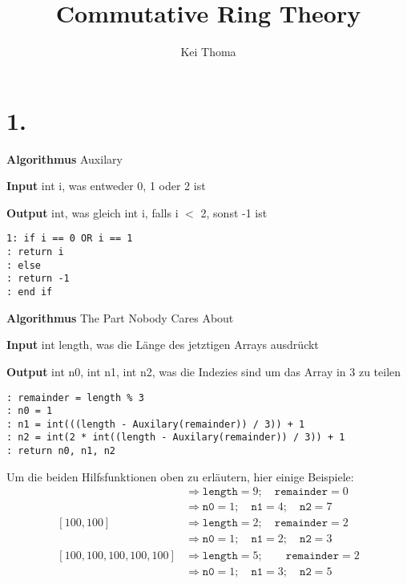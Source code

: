 \documentclass[a4paper]{book}
\title{Commutative Ring Theory}
\author{Kei Thoma}
\theoremstyle{definition}
\begin{document}
\section*{1.}

\noindent\textbf{Algorithmus} Auxilary

\noindent\textbf{Input} int i, was entweder 0, 1 oder 2 ist

\noindent\textbf{Output} int, was gleich int i, falls i \(<\) 2, sonst -1 ist

\texttt{1: if i == 0 OR i == 1 \\
: \indent return i \\
: else \\
: \indent return -1 \\
: end if}

\vspace{1cm}

\noindent\textbf{Algorithmus} The Part Nobody Cares About

\noindent\textbf{Input} int length, was die Länge des jetztigen Arrays ausdrückt

\noindent\textbf{Output} int n0, int n1, int n2, was die Indezies sind um das Array in 3 zu teilen

\texttt{: remainder = length \% 3 \\
    : n0 = 1 \\
    : n1 = int(((length - Auxilary(remainder)) / 3)) + 1 \\
    : n2 = int(2 * int((length - Auxilary(remainder)) / 3)) + 1 \\
    : return n0, n1, n2
}

\vspace{1cm}

\noindent Um die beiden Hilfsfunktionen oben zu erläutern, hier einige Beispiele:
\begin{align*}
    [100, 100, 100, 100, 100, 100, 100, 100, 100] &\Rightarrow \texttt{length} = 9; \quad \texttt{remainder} = 0 \\
    &\Rightarrow \texttt{n0} = 1;\quad \texttt{n1} = 4;\quad \texttt{n2} = 7 \\
    [100, 100] &\Rightarrow \texttt{length} = 2; \quad \texttt{remainder} = 2 \\
    &\Rightarrow \texttt{n0} = 1;\quad \texttt{n1} = 2;\quad \texttt{n2} = 3 \\
    [100, 100, 100, 100, 100] &\Rightarrow \texttt{length} = 5; \qquad \texttt{remainder} = 2\\
    &\Rightarrow \texttt{n0} = 1;\quad \texttt{n1} = 3;\quad \texttt{n2} = 5 \\
\end{align*}
\end{document}
